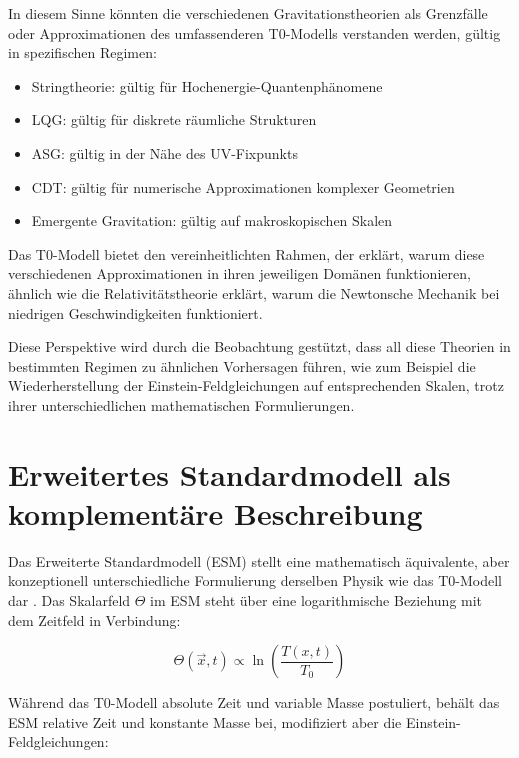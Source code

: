 \documentclass[12pt,a4paper]{article}
\newcommand{\Tfieldt}{T(x,t)}
\newcommand{\Tzero}{T_0}
\newcommand{\vecx}{\vec{x}}
\begin{document}
	In diesem Sinne könnten die verschiedenen Gravitationstheorien als Grenzfälle oder Approximationen des umfassenderen T0-Modells verstanden werden, gültig in spezifischen Regimen:
	
	\begin{itemize}
		\item Stringtheorie: gültig für Hochenergie-Quantenphänomene
		\item LQG: gültig für diskrete räumliche Strukturen
		\item ASG: gültig in der Nähe des UV-Fixpunkts
		\item CDT: gültig für numerische Approximationen komplexer Geometrien
		\item Emergente Gravitation: gültig auf makroskopischen Skalen
	\end{itemize}
	
	Das T0-Modell bietet den vereinheitlichten Rahmen, der erklärt, warum diese verschiedenen Approximationen in ihren jeweiligen Domänen funktionieren, ähnlich wie die Relativitätstheorie erklärt, warum die Newtonsche Mechanik bei niedrigen Geschwindigkeiten funktioniert.
	
	Diese Perspektive wird durch die Beobachtung gestützt, dass all diese Theorien in bestimmten Regimen zu ähnlichen Vorhersagen führen, wie zum Beispiel die Wiederherstellung der Einstein-Feldgleichungen auf entsprechenden Skalen, trotz ihrer unterschiedlichen mathematischen Formulierungen.
	
	\section{Erweitertes Standardmodell als komplementäre Beschreibung}
	\label{sec:esm}
	
	Das Erweiterte Standardmodell (ESM) stellt eine mathematisch äquivalente, aber konzeptionell unterschiedliche Formulierung derselben Physik wie das T0-Modell dar \cite{pascher_esm_comparison_2025}. Das Skalarfeld $\Theta$ im ESM steht über eine logarithmische Beziehung mit dem Zeitfeld in Verbindung:
	
	\begin{equation}
		\Theta(\vecx,t) \propto \ln\left(\frac{\Tfieldt}{\Tzero}\right)
		\label{eq:theta_relation}
	\end{equation}
	
	Während das T0-Modell absolute Zeit und variable Masse postuliert, behält das ESM relative Zeit und konstante Masse bei, modifiziert aber die Einstein-Feldgleichungen:
	
\end{document}
